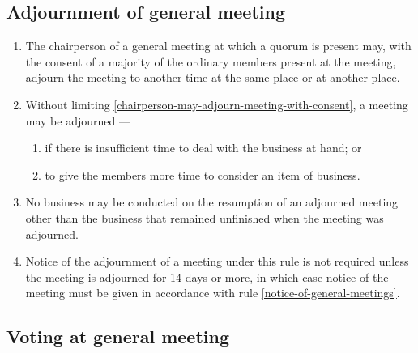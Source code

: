 \documentclass[../constitution.tex]{subfiles}
\begin{document}
\hypertarget{adjournment-of-general-meeting}{%
\subsection{Adjournment of general meeting}\label{adjournment-of-general-meeting}}

\begin{enumerate}

\item The chairperson of a general meeting at which a quorum is present may, with the consent of a majority of the ordinary members present at the meeting, adjourn the meeting to another time at the same place or at another place. \label{chairperson-may-adjourn-meeting-with-consent}
\item Without limiting  \ref{chairperson-may-adjourn-meeting-with-consent}, a meeting may be adjourned ---

  \begin{enumerate}
  
  \item if there is insufficient time to deal with the business at hand; or
  \item to give the members more time to consider an item of business.
  \end{enumerate}
\item No business may be conducted on the resumption of an adjourned meeting other than the business that remained unfinished when the meeting was adjourned.
\item Notice of the adjournment of a meeting under this rule is not required unless the meeting is adjourned for 14 days or more, in which case notice of the meeting must be given in accordance with rule \ref{notice-of-general-meetings}.
\end{enumerate}

\hypertarget{voting-at-general-meeting}{%
\subsection{Voting at general meeting}\label{voting-at-general-meeting}}
\end{document}
